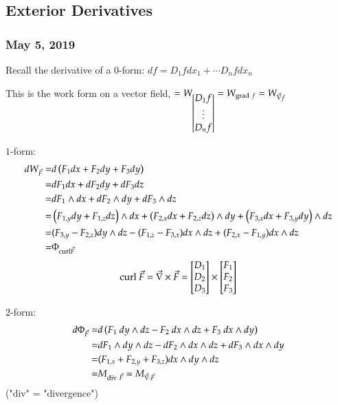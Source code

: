 \subsection{Exterior Derivatives}
\subsubsection*{May 5, 2019}
Recall the derivative of a $0$-form: $df=D_1 f dx_1 + \cdots D_n f dx_n$

This is the work form on a vector field, $=W_{\begin{bmatrix} D_1f \\ \vdots \\ D_nf \end{bmatrix}}=W_{\mathrm{grad}\ f} = W_{\vec{\nabla} f}$

$1$-form: 
\begin{align*}
	dW_{\vec{F}}=&d\left( F_1dx + F_2dy + F_3dy \right)\\
	=& dF_1dx + dF_2dy + dF_3dz \\
	=& dF_1\wedge dx + dF_2\wedge dy + dF_3\wedge dz \\
	=& \left( F_{1,y}dy+F_{1,z}dz \right)\land dx + \left( F_{2,x}dx+F_{2,z}dz \right)\land dy + \left( F_{3,x}dx + F_{3,y}dy \right)\land dz \\
	=& (F_{3,y}-F_{2,z})dy\wedge dz - (F_{1,z}-F_{3,x})dx\wedge dz + (F_{2,x}-F_{1,y})dx\wedge dz \\
	=&\Phi_{\mathrm{curl} \vec{F}}
\end{align*}
\[\mathrm{curl}\ \vec{F}=\vec{\nabla}\times \vec{F}=\mtrx{D_1 \\ D_2 \\ D_3}\times \mtrx{F_1 \\ F_2 \\ F_3}\]

$2$-form: 
\begin{align*}
	d\Phi_{\vec{F}} =& d\left( F_1\ dy\land dz - F_2\ dx\wedge dz + F_3\ dx\wedge dy \right) \\
	=& dF_1\wedge dy\wedge dz - dF_2\wedge dx\wedge dz+ dF_3\wedge dx\wedge dy \\
	=& (F_{1,x}+F_{2,y}+F_{3,z})dx\wedge dy \wedge dz \\
	=& M_{\mathrm{div}\ \vec{F}}=M_{\vec{\nabla}\cdot \vec{F}}
\end{align*} 
("div" = "divergence")

